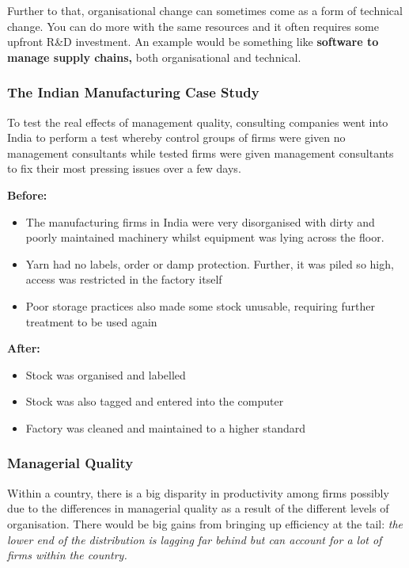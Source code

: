 \documentclass[12pt, letterpaper]{article}
\begin{document}
Further to that, organisational change can sometimes come as a form of technical change. You can do more with the same resources and it often requires some upfront R\&D investment. An example would be something like \textbf{software to manage supply chains,} both organisational and technical.

\subsubsection{The Indian Manufacturing Case Study}
To test the real effects of management quality, consulting companies went into India to perform a test whereby control groups of firms were given no management consultants while tested firms were given management consultants to fix their most pressing issues over a few days.

\textbf{Before:}
\begin{itemize}
	\item The manufacturing firms in India were very disorganised with dirty and poorly maintained machinery whilst equipment was lying across the floor. 
	\item Yarn had no labels, order or damp protection. Further, it was piled so high, access was restricted in the factory itself
	\item Poor storage practices also made some stock unusable, requiring further treatment to be used again
\end{itemize}
\textbf{After:}
\begin{itemize}
	\item Stock was organised and labelled
	\item Stock was also tagged and entered into the computer
	\item Factory was cleaned and maintained to a higher standard
\end{itemize}

\subsubsection{Managerial Quality}
Within a country, there is a big disparity in productivity among firms possibly due to the differences in managerial quality as a result of the different levels of organisation. There would be big gains from bringing up efficiency at the tail: \textit{the lower end of the distribution is lagging far behind but can account for a lot of firms within the country.}\\
\end{document}
